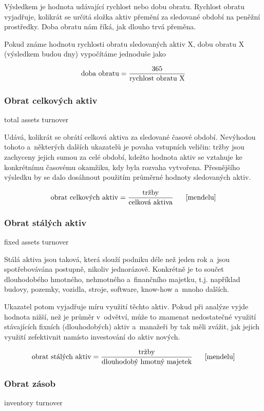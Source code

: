 Výsledkem je hodnota udávající rychlost nebo dobu obratu. Rychlost obratu vyjadřuje, kolikrát se určitá složka aktiv přemění za sledované období na peněžní prostředky. Doba obratu nám říká, jak dlouho trvá přeměna.

Pokud známe hodnotu rychlosti obratu sledovaných aktiv X, dobu obratu X (výsledkem budou dny) vypočítáme jednoduše jako 

$$\text{doba obratu} = \dfrac{\text{365}}{\text{rychlost obratu X}}$$


\subsubsection{Obrat celkových aktiv}
total assets turnover

Udává, kolikrát se obrátí celková aktiva za sledované časové období. Nevýhodou tohoto a~některých dalších ukazatelů je povaha vstupních veličin: tržby jsou zachyceny jejich sumou za celé období, kdežto hodnota aktiv se vztahuje ke konkrétnímu časovému okamžiku, kdy byla rozvaha vytvořena. Přesnějšího výsledku by se dalo dosáhnout použitím průměrné hodnoty sledovaných aktiv. 

$$\vz{obrat celkových aktiv}{tržby}{celková aktiva} \scite{mendelu}$$

\subsubsection{Obrat stálých aktiv}
fixed assets turnover

Stálá aktiva jsou taková, která slouží podniku déle než jeden rok a~jsou spotřebovávána postupně, nikoliv jednorázově. Konkrétně je to součet dlouhodobého hmotného, nehmotného a~finančního majetku, t.j. například budovy, pozemky, vozidla, stroje, software, know-how a~mnoho dalších.

Ukazatel potom vyjadřuje míru využití těchto aktiv. Pokud při analýze vyjde hodnota nižší, než je průměr v~odvětví, může to znamenat nedostatečné využití stávajících fixních (dlouhodobých) aktiv a~manažeři by tak měli zvážit, jak jejich využití zefektivnit namísto investování do aktiv nových.

$$\vz{obrat stálých aktiv}{tržby}{dlouhodobý hmotný majetek} \scite{mendelu}$$

\subsubsection{Obrat zásob}
inventory turnover

